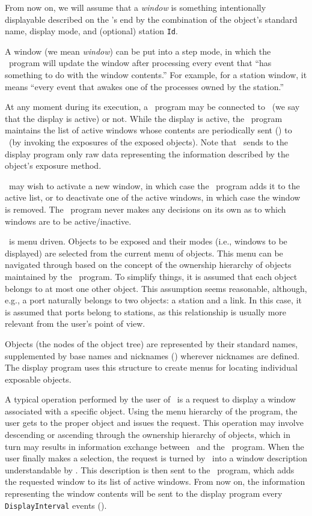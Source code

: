 From now on, we will assume that a {\em window\/} is something intentionally
displayable described on the \smurph's end by the combination of the
object's standard name, display mode, and (optional) station {\tt Id}.

A window (we mean {\em window\/}) can be put into a step mode,
in which the \smurph\ program will update the window after processing
every event that ``has something to do with the window contents.''
For example, for a station window, it means ``every event that
awakes one of the processes owned by the station.''

At any moment during its execution, a \smurph\ program
may be connected to \dsd\ (we say that the display is active) or not.
While the display is active, the \smurph\ program
maintains the list of active windows whose
contents are periodically sent ()
to \dsd\ (by invoking the exposures of the exposed objects).
Note that \smurph\ sends to the display program only
raw data representing the information
described by the object's exposure method.

\dsd\ may wish to activate a new window,
in which case the \smurph\ program
adds it to the active list, or to deactivate one
of the active windows, in which case the window is removed.
The \smurph\ program
never makes any decisions on its own as to which windows are to be
active/inactive.

\dsd\ is menu driven.
Objects to be exposed and their modes (i.e., windows to be displayed)
are selected from the current menu of objects.
This menu can be navigated through based on the concept of the
ownership hierarchy of objects maintained by the
\smurph\ program.
To simplify things, it is assumed that each object belongs to at most one
other object.
This assumption seems reasonable, although, e.g.,
a port naturally belongs to two objects: a station and a link.
In this case, it is assumed that ports belong to stations, as this relationship
is usually more relevant from the user's point of view.

Objects (the nodes of the object tree) are represented by their standard names,
supplemented by base names and nicknames ()
wherever nicknames are defined.
The display program uses this structure to create menus for locating
individual exposable objects.

A typical operation performed by the user of \dsd\ is a request
to display a window associated with a specific object.
Using the menu hierarchy of the program, the user gets to the proper object and
issues the request.
This operation may involve descending or ascending through the ownership
hierarchy of objects, which in turn may results in information
exchange between \dsd\ and the \smurph\ program.
When the user finally makes a selection,
the request is turned by \dsd\ into a window description
understandable by \smurph.
This description is then sent to the \smurph\ program,
which adds the requested window to its list of active windows.
From now on, the information representing the window contents will be
sent to the display program every {\tt DisplayInterval} events
().

